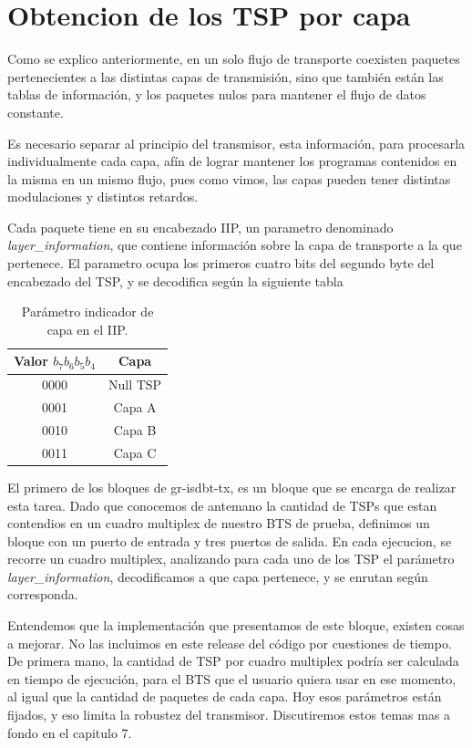 \section{Obtencion de los TSP por capa}

Como se explico anteriormente, en un solo flujo de transporte coexisten paquetes pertenecientes a las distintas capas de transmisión, sino que también están las tablas de información, y los paquetes nulos para mantener el flujo de datos constante. 

Es necesario separar al principio del transmisor, esta información, para procesarla individualmente cada capa, afín de lograr mantener los programas contenidos en la misma en un mismo flujo, pues como vimos, las capas pueden tener distintas modulaciones y distintos retardos. 

Cada paquete tiene en su encabezado IIP, un parametro denominado \textit{layer\_information}, que contiene información sobre la capa de transporte a la que pertenece. El parametro ocupa los primeros cuatro bits del segundo byte del encabezado del TSP, y se decodifica según la siguiente tabla

\begin{table}[h!]
	\centering
	\begin{tabular}{|c|c|}
		\hline
		\textbf{Valor $b_{7}b_{6}b_{5}b_{4}$} & \textbf{Capa}\\
		\hline
		0000 		& Null TSP\\
		\hline
		0001 		& Capa A\\
		\hline
		0010 		& Capa B\\
		\hline
		0011 		& Capa C\\
		\hline
	\end{tabular}
	\caption{\label{Identificador de capa para TSP} Par\'ametro indicador de capa en el IIP.}
\end{table}

El primero de los bloques de gr-isdbt-tx, es un bloque que se encarga de realizar esta tarea. Dado que conocemos de antemano la cantidad de TSPs que estan contendios en un cuadro multiplex de nuestro BTS de prueba, definimos un bloque con un puerto de entrada y tres puertos de salida. En cada ejecucion, se recorre un cuadro multiplex, analizando para cada uno de los TSP el parámetro \textit{layer\_information}, decodificamos a que capa pertenece, y se enrutan según corresponda. 

Entendemos que la implementación que presentamos de este bloque, existen cosas a mejorar. No las incluimos en este release del código por cuestiones de tiempo. De primera mano, la cantidad de TSP por cuadro multiplex podría ser calculada en tiempo de ejecución, para el BTS que el usuario quiera usar en ese momento, al igual que la cantidad de paquetes de cada capa. Hoy esos parámetros están fijados, y eso limita la robustez del transmisor. Discutiremos estos temas mas a fondo en el capitulo 7.

